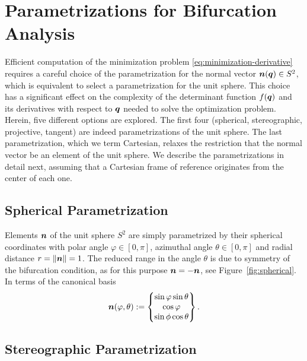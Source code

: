 \documentclass[12pt]{article}
\numberwithin{equation}{section}
\begin{document}
\section{Parametrizations for Bifurcation Analysis}
\label{sec:parametrizations}

Efficient computation of the minimization problem
\eqref{eq:minimization-derivative} requires a careful choice of the
parametrization for the normal vector ${\boldsymbol{n}}({\boldsymbol{q}}) \in S^2$, which is
equivalent to select a parametrization for the unit sphere. This
choice has a significant effect on the complexity of the determinant
function $f({\boldsymbol{q}})$ and its derivatives with respect to ${\boldsymbol{q}}$ needed to
solve the optimization problem. Herein, five different options are
explored. The first four (spherical, stereographic, projective,
tangent) are indeed parametrizations of the unit sphere.  The last
parametrization, which we term Cartesian, relaxes the restriction that
the normal vector be an element of the unit sphere. We describe the
parametrizations in detail next, assuming that a Cartesian frame of
reference originates from the center of each one.

\subsection{Spherical Parametrization}
\label{subsec:spherical}

Elements ${\boldsymbol{n}}$ of the unit sphere $S^2$ are simply parametrized by
their spherical coordinates with polar angle $\varphi \in [0, \pi]$,
azimuthal angle $\theta \in [0, \pi]$ and radial distance $r = \| {\boldsymbol{n}}
\| = 1$. The reduced range in the angle $\theta$ is due to symmetry of
the bifurcation condition, as for this purpose ${\boldsymbol{n}} = - {\boldsymbol{n}}$, see
Figure~\ref{fig:spherical}. In terms
of the canonical basis
\begin{equation}
  {\boldsymbol{n}}(\varphi, \theta)
  :=
  \begin{Bmatrix}
    \sin\varphi \sin\theta
    \\
    \cos\varphi
    \\
    \sin\phi \cos\theta
  \end{Bmatrix}.
\end{equation}

\subsection{Stereographic Parametrization}
\label{subsec:stereographic}
\end{document}
